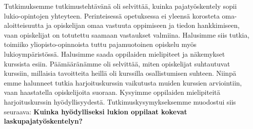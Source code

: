 Tutkimuksemme tutkimustehtävänä oli selvittää, kuinka pajatyöskentely sopii lukio-opintojen yhteyteen. Perinteisessä opetuksessa ei yleensä korosteta oma-aloitteisuutta ja opiskelijan omaa vastuuta oppimiseen ja tiedon hankkimiseen, vaan opiskelijat on totutettu saamaan vastaukset valmiina. Halusimme siis tutkia, toimiiko yliopisto-opinnoista tuttu pajamuotoinen opiskelu myös lukioympäristössä.
Halusimme saada oppilaiden mielipiteet ja näkemyk\-set kurssista esiin. Päämääränämme oli selvittää, miten opiskelijat suhtautuvat kurssiin, millaisia tavoitteita heillä oli kurssilla osallistumisen suhteen.
Niinpä emme halunneet tutkia harjoituskurssin vaikutusta muiden kurssien arviointiin, vaan haastatella opiskelijoita suoraan. Kysyimme oppilaiden mielipiteitä harjoituskurssin hyödyllisyydestä.
Tutkimuskysymykseksemme muodostui siis seuraava:
\textbf{Kuinka hyödylliseksi lukion oppilaat kokevat laskupajatyöskentelyn?}

